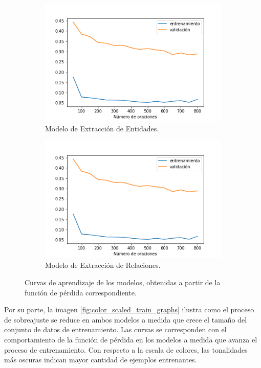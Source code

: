\begin{figure}[h!]
	\centering
	\begin{subfigure}{.5\linewidth}
		\centering
		\includegraphics[width=\linewidth]{Graphics/learning_curves_relations.png}
		\caption{Modelo de Extracción de Entidades.}
	\end{subfigure}%
	\begin{subfigure}{.5\linewidth}
		\centering
		\includegraphics[width=\linewidth]{Graphics/learning_curves_relations.png}
		\caption{Modelo de Extracción de Relaciones.}
	\end{subfigure}
	\caption{Curvas de aprendizaje de los modelos, obtenidas a partir de la función de pérdida correspondiente. } \label{fig:learning_curves}
\end{figure}

Por su parte, la imagen \ref{fig:color_scaled_train_graphs} ilustra como el proceso de sobreajuste se reduce en ambos modelos a medida que crece el tamaño del conjunto de datos de entrenamiento.
Las curvas se corresponden con el comportamiento de la función de pérdida en los modelos a medida que avanza el proceso de entrenamiento.
Con respecto a la escala de colores, las tonalidades más oscuras indican mayor cantidad de ejemplos entrenantes.

